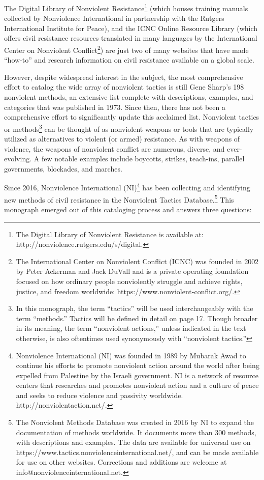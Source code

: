 \documentclass[twoside,a4paper,12pt,fleqn,openany]{extbook}
\begin{document}
The Digital Library of Nonviolent Resistance\footnote{The Digital Library of Nonviolent Resistance is available at: http://nonviolence.rutgers.edu/s/digital.} (which houses training manuals collected by Nonviolence International in partnership with the Rutgers International Institute for Peace), and the ICNC Online Resource Library (which offers civil resistance resources translated in many languages by the International Center on Nonviolent Conflict\footnote{The International Center on Nonviolent Conflict (ICNC) was founded in 2002 by Peter Ackerman and Jack DuVall and is a private operating foundation focused on how ordinary people nonviolently struggle and achieve rights, justice, and freedom worldwide: https://www.nonviolent-conflict.org/.}) are just two of many websites that have made “how-to” and research information on civil resistance available on a global scale.

However, despite widespread interest in the subject, the most comprehensive effort to catalog the wide array of nonviolent tactics is still Gene Sharp’s 198 nonviolent methods, an extensive list complete with descriptions, examples, and categories that was published in 1973. Since then, there has not been a comprehensive effort to significantly update this acclaimed list. Nonviolent tactics or methods\footnote{In this monograph, the term “tactics” will be used interchangeably with the term “methods.” Tactics will be defined in detail on page 17. Though broader in its meaning, the term “nonviolent actions,” unless indicated in the text otherwise, is also oftentimes used synonymously with “nonviolent tactics.”} can be thought of as nonviolent weapons or tools that are typically utilized as alternatives to violent (or armed) resistance. As with weapons of violence, the weapons of nonviolent conflict are numerous, diverse, and ever-evolving. A few notable examples include boycotts, strikes, teach-ins, parallel governments, blockades, and marches.

Since 2016, Nonviolence International (NI)\footnote{Nonviolence International (NI) was founded in 1989 by Mubarak Awad to continue his efforts to promote nonviolent action around the world after being expelled from Palestine by the Israeli government. NI is a network of resource centers that researches and promotes nonviolent action and a culture of peace and seeks to reduce violence and passivity worldwide. http://nonviolentaction.net/.} has been collecting and identifying new methods of civil resistance in the Nonviolent Tactics Database.\footnote{The Nonviolent Methods Database was created in 2016 by NI to expand the documentation of methods worldwide. It documents more than 300 methods, with descriptions and examples. The data are available for universal use on https://www.tactics.nonviolenceinternational.net/, and can be made available for use on other websites. Corrections and additions are welcome at info@nonviolenceinternational.net.} This monograph emerged out of this cataloging process and answers three questions:
\end{document}
